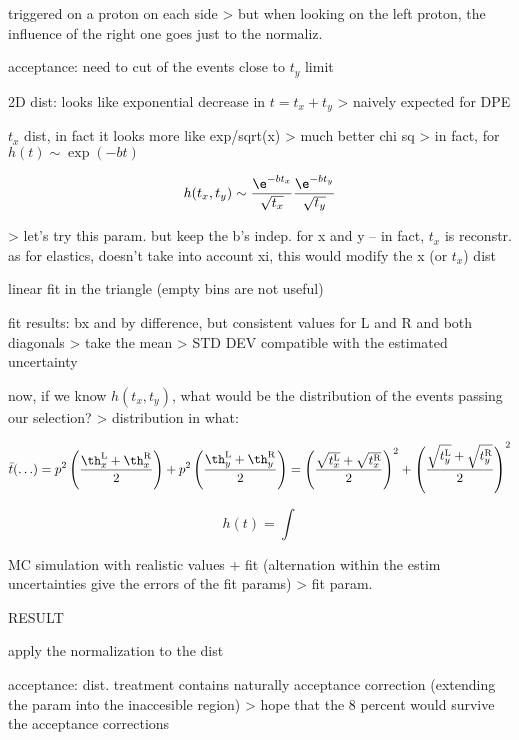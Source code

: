\> triggered on a proton on each side
\>> but when looking on the left proton, the influence of the right one goes just to the normaliz.

\> acceptance: need to cut of the events close to $t_y$ limit

\> 2D dist: looks like exponential decrease in $t = t_x + t_y$
\>> naively expected for DPE

\> $t_x$ dist, in fact it looks more like exp/sqrt(x)
\>> much better chi sq
\>> in fact, for $h(t) \sim \exp(-b t)$

$$h(t_x, t_y) \sim {\e^{-b t_x}\over \sqrt{t_x}} {\e^{-b t_y}\over \sqrt{t_y}}$$

\>> let's try this param. but keep the b's indep. for x and y -- in fact, $t_x$ is reconstr. as for elastics, doesn't take into account xi, this would modify the x (or $t_x$) dist

\> linear fit in the triangle (empty bins are not useful)

\> fit results: bx and by difference, but consistent values for L and R and both diagonals
\>> take the mean
\>> STD DEV compatible with the estimated uncertainty

\> now, if we know $h(t_x, t_y)$, what would be the distribution of the events passing our selection?
\>> distribution in what:

$$\bar t(\ldots)
= p^2 \left( \th_x^{\rm L} + \th_x^{\rm R} \over 2 \right) + p^2 \left( \th_y^{\rm L} + \th_y^{\rm R} \over 2 \right)
= \left( \sqrt{t_x^{\rm L}} + \sqrt{t_x^{\rm R}}\over 2 \right)^2 + \left( \sqrt{t_y^{\rm L}} + \sqrt{t_y^{\rm R}}\over 2 \right)^2 $$

$$h(t) = \int $$

\> MC simulation with realistic values + fit (alternation within the estim uncertainties give the errors of the fit params)
\>> fit param.

\bmfig
{}
\emfig


RESULT

\> apply the normalization to the dist

\> acceptance: dist. treatment contains naturally acceptance correction (extending the param into the inaccesible region)
\>> hope that the 8 percent would survive the acceptance corrections


